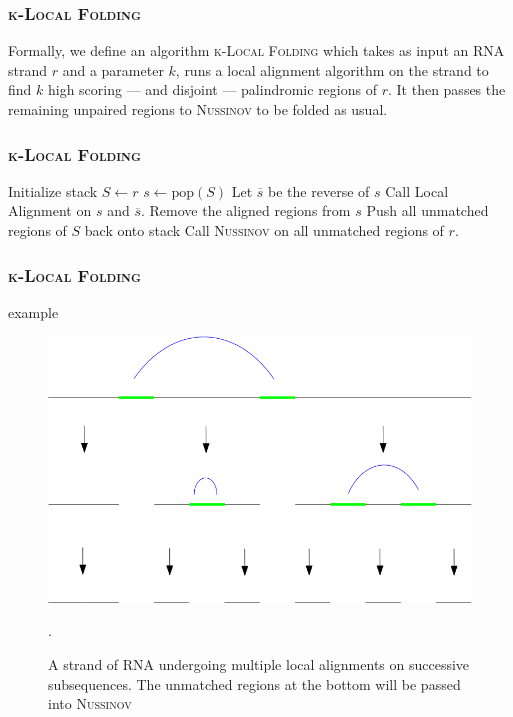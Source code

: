 \documentclass{beamer}
\newcommand{\klf}{\textsc{k-Local Folding} }
\newcommand{\rf}{\textsc{Nussinov} }
\begin{document}
\begin{frame}
\frametitle{\klf}
Formally, we define an algorithm \klf which takes as input an RNA strand $r$ and a parameter $k$, runs a local alignment algorithm on the strand to find $k$ high scoring --- and disjoint --- palindromic regions of $r$. It then passes the remaining unpaired regions to \rf to be folded as usual.
\end{frame}

\begin{frame}
\frametitle{\klf} 
\begin{algorithmic}[1]
\State Initialize stack $S\gets r$
\State $s\gets \text{pop}(S)$
\State Let $\overline{s}$ be the reverse of $s$
\State Call Local Alignment on $s$ and $\overline{s}$.
\State Remove the aligned regions from $s$
\State Push all unmatched regions of $S$ back onto stack
\EndIf 
\EndWhile
\State Call \rf on all unmatched regions of $r$. 
\EndProcedure
\end{algorithmic}
\end{frame}

\begin{frame}
\frametitle{\klf}
\begin{block}{example}
\begin{figure}
\centering
\includegraphics[scale=0.28]{images/k_local_sequence.png}
\caption{A strand of RNA undergoing multiple local alignments on successive subsequences. The unmatched regions at the bottom will be passed into \rf}. 
\end{figure}
\end{block}
\end{frame}
\end{document}
